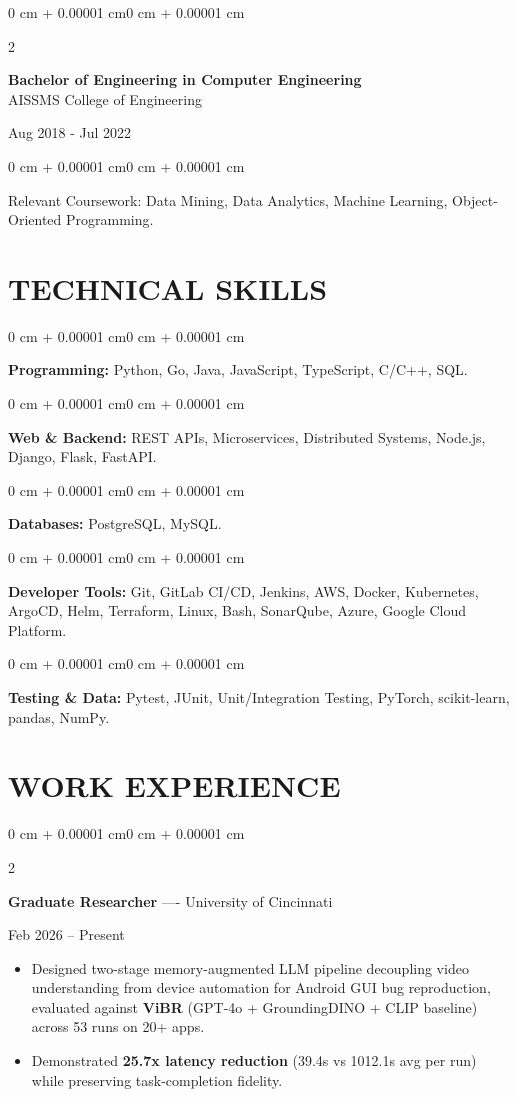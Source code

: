 \documentclass[10pt, letterpaper]{article}
\newenvironment{highlights}{
    \begin{itemize}[
        topsep=0.10 cm,
        parsep=0.06 cm,
        partopsep=0pt,
        itemsep=0.06 cm,
        leftmargin=12pt
    ]
}{
    \end{itemize}
}
\newenvironment{onecolentry}{
    \begin{adjustwidth}{0 cm + 0.00001 cm}{0 cm + 0.00001 cm}
}{
    \end{adjustwidth}
}
\newenvironment{twocolentry}[2][]{
    \onecolentry
    \def\secondColumn{#2}
    \setcolumnwidth{\fill, 4.5 cm}
    \begin{paracol}{2}
}{
    \switchcolumn \raggedleft \secondColumn
    \end{paracol}
    \endonecolentry
}
\begin{document}
\begin{twocolentry}{
    Aug 2018 - Jul 2022
}
    \textbf{Bachelor of Engineering in Computer Engineering} \\
    AISSMS College of Engineering
\end{twocolentry}
\begin{onecolentry}
Relevant Coursework: Data Mining, Data Analytics, Machine Learning, Object-Oriented Programming.
\end{onecolentry}
\section{TECHNICAL SKILLS}
\begin{onecolentry}
\textbf{Programming:} Python, Go, Java, JavaScript, TypeScript, C/C++, SQL.
\end{onecolentry}
\vspace{0.06 cm}
\begin{onecolentry}
\textbf{Web \& Backend:} REST APIs, Microservices, Distributed Systems, Node.js, Django, Flask, FastAPI.
\end{onecolentry}
\vspace{0.06 cm}
\begin{onecolentry}
\textbf{Databases:} PostgreSQL, MySQL.
\end{onecolentry}
\vspace{0.06 cm}
\begin{onecolentry}
\textbf{Developer Tools:} Git, GitLab CI/CD, Jenkins, AWS, Docker, Kubernetes, ArgoCD, Helm, Terraform, Linux, Bash, SonarQube, Azure, Google Cloud Platform.
\end{onecolentry}
\vspace{0.06 cm}
\begin{onecolentry}
\textbf{Testing \& Data:} Pytest, JUnit, Unit/Integration Testing, PyTorch, scikit-learn, pandas, NumPy.
\end{onecolentry}

\section{WORK EXPERIENCE}
\begin{twocolentry}{Feb 2026 -- Present}
\textbf{Graduate Researcher} ---- University of Cincinnati
\end{twocolentry}
\begin{highlights}
  \item Designed two-stage memory-augmented LLM pipeline decoupling video understanding from device automation for Android GUI bug reproduction, evaluated against \textbf{ViBR} (GPT-4o + GroundingDINO + CLIP baseline) across 53 runs on 20+ apps.
  \item Demonstrated \textbf{25.7x latency reduction} (39.4s vs 1012.1s avg per run) while preserving task-completion fidelity.
\end{highlights}
\end{document}
